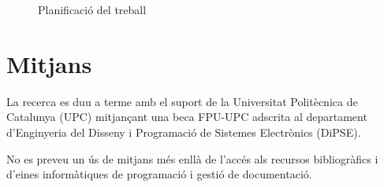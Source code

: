 \begin{figure}[tp]
\centering
{}
\caption{Planificació del treball}
\label{fig:pla:futur}
\end{figure}

\pagebreak[4]
\section{Mitjans}

La recerca es duu a terme amb el suport de la Universitat Politècnica
de Catalunya (UPC) mitjançant una beca FPU-UPC adscrita al departament
d'Enginyeria del Disseny i Programació de Sistemes Electrònics
(DiPSE).


No es preveu un ús de mitjans més enllà de l'accés als
recursos bibliogràfics i d'eines informàtiques de programació i
gestió de documentació.










